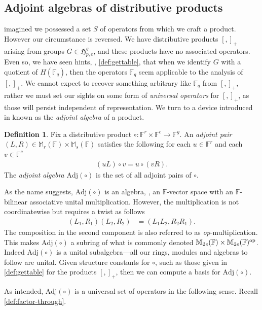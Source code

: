 \documentclass{toc}
\numberwithin{equation}{section}
\theoremstyle{plain}       %
\theoremstyle{remark}
\theoremstyle{definition}
\newtheorem{defn}[equation]{Definition}
\numberwithin{figure}{section}
\numberwithin{table}{section}
\newcommand{\mygroups}{\mathfrak{H}}
\newcommand{\bbF}{\mathbb{F}}  %
\begin{document}
\subsection{Adjoint algebras of distributive products}\label{sec:adjoint}
 imagined we possessed a set $S$ of operators from which
we craft a product.  However our circumstance is reversed.  We have distributive
products $[,]_+$ arising from  groups $G\in\mygroups_{p,e}^g$, and these
products have no associated operators.  Even so, we have seen hints, \eg,
\eqref{def:gettable}, that when we identify  $G$ with a quotient of $H(\bbF_q)$,
then the operators $\bbF_q$ seem applicable to the analysis of $[,]_+$.  We
cannot expect to recover something arbitrary like $\bbF_q$ from $[,]_+$, rather
we must set our sights on some form of \emph{universal operators} for $[,]_+$,
as those will persist independent of representation.  We turn to a device
introduced in \cite{Wilson:unique-cent} known as the \emph{adjoint algebra} of a
product.

\begin{defn}
	Fix a distributive product $\circ:\bbF^r\times \bbF^c\to \bbF^g$.  An
	\emph{adjoint pair} $(L,R)\in \mathbb{M}_r(\bbF)\times\mathbb{M}_s(\bbF)$
	satisfies the following for each $u\in \bbF^r$ and each $v\in \bbF^c$
	\begin{align*}
		(uL)\circ v=u\circ (vR).
	\end{align*}
	The \emph{adjoint algebra} $\mathrm{Adj}(\circ)$ is the set of all adjoint
	pairs of $\circ$.
\end{defn}

As the name suggests, $\mathrm{Adj}(\circ)$ is an algebra, \ie, an $\bbF$-vector
space with an $\bbF$-bilinear associative unital multiplication.  However, the
multiplication is not coordinatewise but requires a twist as follows
\begin{align}
	(L_1,R_1)(L_2,R_2) &= (L_1L_2,R_2R_1).
\end{align}
The composition in the second component is also referred to as
\emph{op}-multiplication.  This makes $\mathrm{Adj}(\circ)$ a subring of what is
commonly denoted $\mathbb{M}_{2e}(\bbF)\times \mathbb{M}_{2e}(\bbF)^{\rm op}$.
Indeed $\mathrm{Adj}(\circ)$ is a unital subalgebra---all our rings, modules
and algebras to follow are unital.  Given structure constants for $\circ$, such
as those given in \eqref{def:gettable} for the products $[,]_+$, then we can
compute a basis for $\mathrm{Adj}(\circ)$.

As intended, $\mathrm{Adj}(\circ)$ is a universal set of operators in the
following sense.  Recall \eqref{def:factor-through}.
\end{document}
